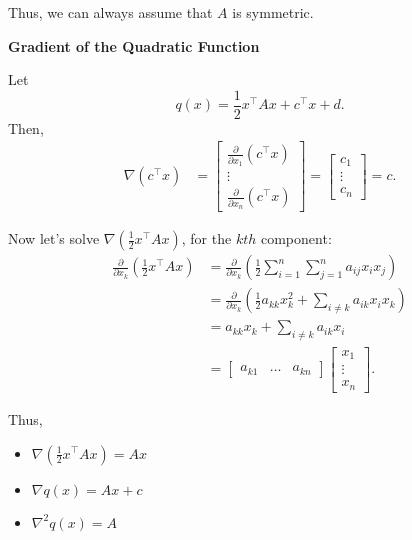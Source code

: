 \begin{example}
    Thus, we can always assume that \(A\) is symmetric.
    \vspace{1em}

    \textbf{Gradient of the Quadratic Function}

    Let 
    \[
    q(x) = \frac{1}{2} x^\top A x + c^\top x + d.
    \]
    Then,
    \begin{align*}
    \nabla(c^\top x) &= \begin{bmatrix}
    \frac{\partial}{\partial x_1} (c^\top x) \\
    \vdots \\
    \frac{\partial}{\partial x_n} (c^\top x)
    \end{bmatrix} 
    = \begin{bmatrix}
    c_1 \\
    \vdots \\
    c_n
    \end{bmatrix}
    = c.
    \end{align*}

    Now let's solve $\nabla\left(\frac{1}{2} x^\top A x\right)$, for the $kth$ component:
    \begin{align*}
     \frac{\partial}{\partial x_k} \left(\frac{1}{2} x^\top A x\right) &= \frac{\partial}{\partial x_k} \left( \frac{1}{2} \sum_{i=1}^n \sum_{j=1}^n a_{ij} x_i x_j \right) \\
    &= \frac{\partial}{\partial x_k} \left( \frac{1}{2} a_{kk} x_k^2 + \sum_{i \neq k} a_{ik} x_i x_k \right) \\
    &= a_{kk} x_k + \sum_{i \neq k} a_{ik} x_i \\
    &= \begin{bmatrix}
    a_{k1} & \dots & a_{kn}
    \end{bmatrix}
    \begin{bmatrix}
    x_1 \\
    \vdots \\
    x_n
    \end{bmatrix}.
    \end{align*}

    Thus,
    \begin{itemize}
        \item $\nabla\left(\frac{1}{2} x^\top A x\right) = A x$
        \item $\nabla q(x) = A x + c$
        \item $\nabla^2 q(x) = A$
    \end{itemize}
\end{example}

